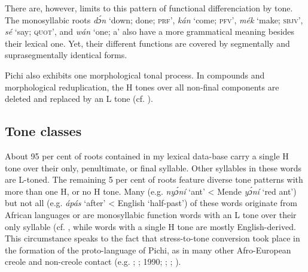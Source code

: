 
There are, however, limits to this pattern of functional differenciation by tone. The monosyllabic roots \textit{dɔ́n} ‘down; done; \textsc{prf’}, \textit{kán} ‘come; \textsc{pfv’,} \textit{mék} ‘make; \textsc{sbjv}’, \textit{sé} ‘say; \textsc{quot’,} and \textit{wán} ‘one; a’ also have a more grammatical meaning besides their lexical one. Yet, their different functions are covered by segmentally and suprasegmentally identical forms. 


Pichi also exhibits one morphological tonal process. In compounds and morphological reduplication, the H tones over all non-final components are deleted and replaced by an L tone (cf. ).


\subsection{Tone classes}\label{sec:3.1.3}

About 95 per cent of roots contained in my lexical data-base carry a single H tone over their only, penultimate, or final syllable. Other syllables in these words are L-toned. The remaining 5 per cent of roots feature diverse tone patterns with more than one H, or no H tone. Many (e.g. \textit{nyɔ́ní} ‘ant’ < Mende \textit{yɔ́ní} ‘red ant’) but not all (e.g. \textit{ápás} ‘after’ < English ‘half-past’) of these words originate from African languages or are monosyllabic function words with an L tone over their only syllable (cf. , while words with a single H tone are mostly English-derived. This circumstance speaks to the fact that stress-to-tone conversion took place in the formation of the proto-language of Pichi, as in many other Afro-European creole and non-creole contact (e.g. \citealt{Berry1970}; \citealt{Criper1971}; 1990; \citealt{Alleyne1980}; \citealt{GussenhovenUdofot2010}; \citealt{Steien2015}). 

